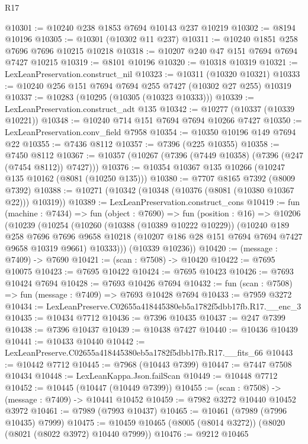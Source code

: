 \begin{lexlean}{R17}
\begin{coremodule}
@10301 := @10240 @238 @1853 @7694 @10143 @237 @10219
@10302 := @8194 @10196
@10305 := @10301 (@10302 @11 @237)
@10311 := @10240 @1851 @258 @7696 @7696 @10215 @10218
@10318 := @10207 @240 @47 @151 @7694 @7694 @7427 @10215
@10319 := @8101 @10196
@10320 := @10318 @10319
@10321 := LexLeanPreservation.construct_nil
@10323 := @10311 (@10320 @10321)
@10333 := @10240 @256 @151 @7694 @7694 @255 @7427 (@10302 @27 @255) @10319
@10337 := @10283 (@10295 (@10305 (@10323 @10333)))
@10339 := LexLeanPreservation.construct_adt @135
@10342 := @10277 (@10337 (@10339 @10221))
@10348 := @10240 @714 @151 @7694 @7694 @10266 @7427
@10350 := LexLeanPreservation.conv_field @7958
@10354 := @10350 @10196 @149 @7694 @22
@10355 := @7436 @8112
@10357 := @7396 (@225 @10355)
@10358 := @7450 @8112
@10367 := @10357 (@10267 (@7396 (@7449 @10358) (@7396 (@247 (@7454 @8112)) @7427)))
@10376 := @10354 @10367 @135 @10266 (@10247 @135 @10162 (@8081 (@10250 @135)))
@10380 := @7707 @8165 @7392 (@8009 @7392)
@10388 := @10271 (@10342 (@10348 (@10376 (@8081 (@10380 @10367 @22))) @10319))
@10389 := LexLeanPreservation.construct_cons
@10419 := fun (machine : @7434) =>
  fun (object : @7690) =>
  fun (position : @16) =>
  @10206
    (@10239
      (@10254
        (@10260
          (@10388 (@10389 @10222 @10229))
          (@10240
            @189
            @258
            @7696
            @7696
            @9658
            @10218
            (@10207 @186 @28 @151 @7694 @7694 @7427 @9658 @10319 @9661)
            @10333)))
      (@10339 @10236))
@10420 := (message : @7409) -> @7690
@10421 := (scan : @7508) -> @10420
@10422 := @7695 @10075
@10423 := @7695 @10422
@10424 := @7695 @10423
@10426 := @7693 @10424 @7694
@10428 := @7693 @10426 @7694
@10432 := fun (scan : @7508) => fun (message : @7409) => @7693 @10428 @7694
@10433 := @7959 @3272
@10434 := LexLeanPreserve.C02655a418445380eb5a1782f5dbb17fb.R17.__enc_3
@10435 := @10434 @7712
@10436 := @7396 @10435
@10437 := @247 @7399
@10438 := @7396 @10437
@10439 := @10438 @7427
@10440 := @10436 @10439
@10441 := @10433 @10440
@10442 := LexLeanPreserve.C02655a418445380eb5a1782f5dbb17fb.R17.__fits_66
@10443 := @10442 @7712
@10445 := @7968 (@10443 @7399)
@10447 := @7447 @7508 @10434
@10448 := LexLeanKappa.Json.failScan
@10449 := @10448 @7712
@10452 := @10445 (@10447 (@10449 @7399))
@10455 := (scan : @7508) -> (message : @7409) -> @10441 @10452
@10459 := @7982 @3272 @10440 @10452 @3972
@10461 := @7989 (@7993 @10437)
@10465 := @10461 (@7989 (@7996 @10435) @7999)
@10475 := @10459 @10465 (@8005 (@8014 @3272)) (@8020 (@8021 (@8022 @3972) @10440 @7999))
@10476 := @9212 @10465

\end{coremodule}
\end{lexlean}
